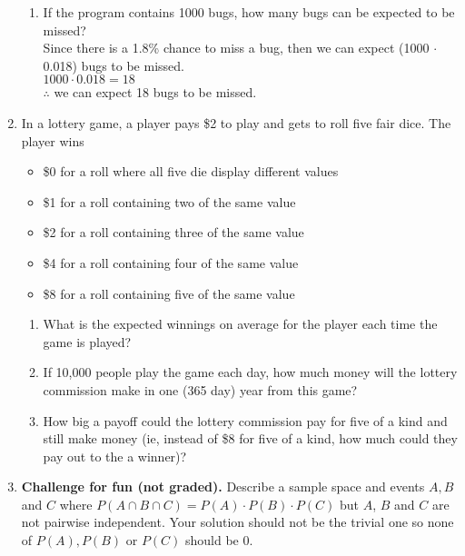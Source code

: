 \documentclass{article}
\begin{document}
\begin{enumerate}
\begin{enumerate}
\item If the program contains 1000 bugs, how many bugs can be expected to be missed?\\

Since there is a 1.8\% chance to miss a bug, then we can expect (1000 $\cdot$ 0.018) bugs to be missed.\\
$1000 \cdot 0.018 = 18$\\
$\therefore$ we can expect 18 bugs to be missed.

\end{enumerate}


\item In a lottery game, a player pays \$2 to play and gets to roll five fair dice.  The player wins 
\begin{itemize}
\item \$0 for a roll where all five die display different values
\item \$1 for a roll containing two of the same value
\item \$2 for a roll containing three of the same value
\item \$4 for a roll containing four of the same value
\item \$8 for a roll containing five of the same value
\end{itemize}
\begin{enumerate}
\item What is the expected winnings on average for the player each time the game is played?

\item  If 10,000 people play the game each day, how much money will the lottery commission make in one (365 day) year from this game? 

\item How big a payoff could the lottery commission pay for five of a kind and still make money (ie, instead of \$8 for five of a kind, how much could they pay out to the a winner)? 
\end{enumerate}

\item \textbf{Challenge for fun (not graded).} Describe a sample space and events $A, B$ and $C$ where $P(A\cap B\cap C) = P(A)\cdot P(B) \cdot P(C)$ but $A$, $B$ and $C$ are not pairwise independent.  Your solution should not be the trivial one so none of $P(A), P(B)$ or $P(C)$ should be 0. 


\end{enumerate}
\end{document}
